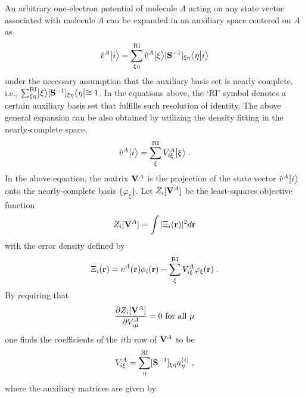 \documentclass[aip,jcp,amsmath,amssymb,reprint,floatfix]{revtex4-1}
\begin{document}
An arbitrary one\hyp{}electron potential of molecule $A$ acting on any state vector 
associated with molecule $A$ can be expanded in an auxiliary space centered 
on $A$ as
%
\begin{equation}
   \hat{v}^{A}\Ket{i} = \sum_{\xi\eta}^{\rm RI} \hat{v}^{A}\Ket{\xi} [{\bf S}^{-1}]_{\xi\eta} \BraKet{\eta}{i}
\end{equation}
%
under the necessary assumption that the auxiliary basis set is nearly complete,
i.e., 
$\sum_{\xi\eta}^{\rm RI} \Ket{\xi}[{\bf S}^{-1}]_{\xi\eta} \Bra{\eta} \cong 1$.
In the equations above, 
the `RI' symbol denotes a certain auxiliary basis set that fulfills such resolution of identity. 
The above general expansion can be also obtained by 
utilizing the density fitting
in the nearly\hyp{}complete space,
%
\begin{equation} \label{e:v-compl}
 \hat{v}^{A}\Ket{i} = \sum_{\xi}^{\rm RI} V^A_{i\xi} \Ket{\xi} \;.
\end{equation}
%
In the above equation,
the matrix ${\bf V}^A$
is the projection of the state vector $\hat{v}^{A} \Ket{i}$
onto the nearly\hyp{}complete basis $\{ \varphi_\xi \}$.
Let $Z_i[{\bf V}^A]$ be the least\hyp{}squares objective function 
%
\begin{equation} \label{e:z-compl}
 Z_i[{\bf V}^A] = \int \vert \Xi_i({\bf r}) \vert^2 d{\bf r}
\end{equation}
%
with the error density defined by
%
\begin{equation} \label{e:error-compl}
 \Xi_i({\bf r}) = v^A({\bf r}) \phi_i({\bf r}) - \sum_\xi^{\rm RI} V^A_{i\xi} \varphi_\xi({\bf r}) \;.
\end{equation}
%
By requiring that
%
\begin{equation} \label{e:z-necessary-requirement}
 \frac{\partial Z_i[{\bf V}^A]}{\partial V^A_{i\mu}} = 0 \text{ for all $\mu$}
\end{equation}
%
one finds the coefficients of the $i$th row of ${\bf V}^A$ to be
%
\begin{equation} \label{e:gdf-compl.v}
  V^A_{i\xi} = \sum_\eta^{\rm RI} [{\bf S}^{-1}]_{\xi\eta} a^{(i)}_\eta \;,
\end{equation}
%
where the auxiliary matrices are given by
\end{document}

